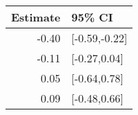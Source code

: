 \begin{tabular}{rl}
  \hline
Estimate & 95\% CI \\ 
  \hline
-0.40 & [-0.59,-0.22] \\ 
  -0.11 & [-0.27,0.04] \\ 
  0.05 & [-0.64,0.78] \\ 
  0.09 & [-0.48,0.66] \\ 
   \hline
\end{tabular}

